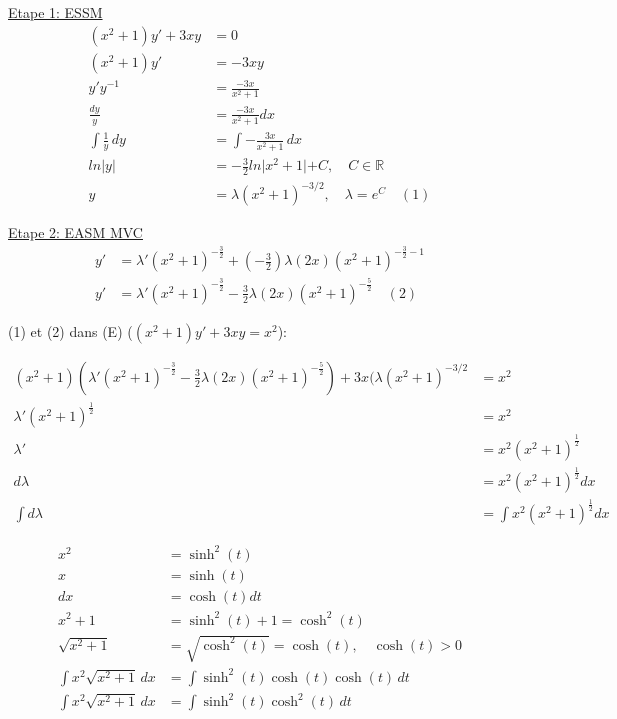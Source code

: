 \underline{Etape 1: ESSM} \\
\begin{align*}
    (x^2+1)y' + 3xy &= 0  \\
    (x^2+1)y' &= -3xy  \\
    y'y^{-1} &= \frac{-3x}{x^2+1} \\
    \frac{dy}{y} &= \frac{-3x}{x^2+1} dx \\
    \int \frac{1}{y} \, dy &= \int -\frac{3x}{x^2+1} \, dx \\
    ln \lvert y \lvert &= -\frac{3}{2} ln \lvert x^2 + 1 \lvert + C, \quad C \in \mathbb{R} \\
    y &= \lambda (x^2 + 1)^{-3/2}, \quad \lambda = e^C \quad (1)
\end{align*}

\underline{Etape 2: EASM MVC}
\begin{align*}
	y' &= \lambda'(x^2+1)^{-\frac{3}{2}} + (-\frac{3}{2}) \lambda (2x)(x^2+1)^{-\frac{3}{2}-1} \\
	y' &= \lambda'(x^2+1)^{-\frac{3}{2}} -\frac{3}{2} \lambda (2x)(x^2+1)^{-\frac{5}{2}} \quad (2) 
\end{align*}

(1) et (2) dans (E) ($(x^2 + 1) y' + 3xy = x^2$):

\begin{align*}
	(x^2 + 1) (\lambda'(x^2+1)^{-\frac{3}{2}} -\frac{3}{2} \lambda (2x)(x^2+1)^{-\frac{5}{2}}) + 3x (\lambda (x^2 + 1)^{-3/2} &= x^2 \\
	\lambda'(x^2+1)^{\frac{1}{2}} &= x^2 \\
	\lambda' &= x^2(x^2 + 1)^{\frac{1}{2}} \\
	d\lambda &= x^2(x^2 + 1)^{\frac{1}{2}} dx \\
	\int d\lambda &= \int x^2(x^2 + 1)^{\frac{1}{2}} dx
\end{align*}

\begin{align*}
	x^2 &= \sinh^2(t) \\
    x &= \sinh(t) \\
	dx &= \cosh(t) dt \\
	x^2 + 1 &= \sinh^2(t) + 1 = \cosh^2(t) \\
	\sqrt{x^2+1} &= \sqrt{\cosh^2(t)} = \cosh(t), \quad \cosh(t) > 0 \\
	\int x^2\sqrt{x^2+1} \, dx &= \int \sinh^2(t) \cosh(t)\cosh(t) \, dt \\
	\int x^2\sqrt{x^2+1} \, dx &= \int \sinh^2(t)\cosh^2(t) \, dt
\end{align*}

